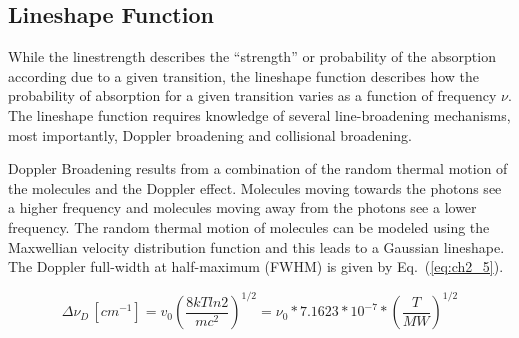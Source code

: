 \subsection{Lineshape Function}
While the linestrength describes the ``strength'' or probability of the absorption according due to a given transition, the lineshape function describes how the probability of absorption for a given transition varies as a function of frequency $\nu$. The lineshape function requires knowledge of several line-broadening mechanisms, most importantly, Doppler broadening and collisional broadening.


Doppler Broadening results from a combination of the random thermal motion of the molecules and the Doppler effect. Molecules moving towards the photons see a higher frequency and molecules moving away from the photons see a lower frequency. The random thermal motion of molecules can be modeled using the Maxwellian velocity distribution function and this leads to a Gaussian lineshape. The Doppler full-width at half-maximum (FWHM) is given by Eq.\ (\ref{eq:ch2_5}).

\begin{equation}\label{eq:ch2_5}
\Delta\nu_D \,[cm^{-1}]=v_0(\frac{8kTln2}{mc^2})^{1/2}=\nu_{0}*7.1623*10^{-7}*(\frac{T}{MW})^{1/2}
\end{equation}

